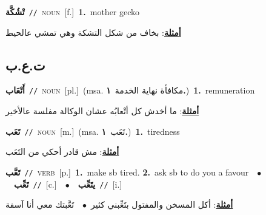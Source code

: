 \documentclass[10pt,a4paper,twoside]{article} %
\begin{document}
\begin{multicols}{2}
{\setlength\topsep{0pt}\textbf{\foreignlanguage{arabic}{تْشُكَّة}}\ {\color{gray}\texttt{//}\color{black}}\ \textsc{noun}\ [f.]\ \textbf{1.}~mother gecko\  \begin{flushright}\color{gray}\foreignlanguage{arabic}{\textbf{\underline{\foreignlanguage{arabic}{أمثلة}}}: بخاف من شكل التشكة وهي تمشي عالحيط}\end{flushright}\color{black}} \vspace{2mm}

\vspace{-3mm}
\subsection*{\color{blue}\foreignlanguage{arabic}{ت.ع.ب}\color{blue}{}} 

{\setlength\topsep{0pt}\textbf{\foreignlanguage{arabic}{أَتْعَاب}}\ {\color{gray}\texttt{//}\color{black}}\ \textsc{noun}\ [pl.]\ \color{gray}(msa. \foreignlanguage{arabic}{مكافأة نهاية الخدمة}~\foreignlanguage{arabic}{\textbf{١.}})\color{black}\ \textbf{1.}~remuneration\  \begin{flushright}\color{gray}\foreignlanguage{arabic}{\textbf{\underline{\foreignlanguage{arabic}{أمثلة}}}: ما أخدش كل أتْعابُه عشان الوكالة مفلسة عالأخير}\end{flushright}\color{black}} \vspace{2mm}

{\setlength\topsep{0pt}\textbf{\foreignlanguage{arabic}{تَعَب}}\ {\color{gray}\texttt{//}\color{black}}\ \textsc{noun}\ [m.]\ \color{gray}(msa. \foreignlanguage{arabic}{تَعَب}~\foreignlanguage{arabic}{\textbf{١.}})\color{black}\ \textbf{1.}~tiredness\  \begin{flushright}\color{gray}\foreignlanguage{arabic}{\textbf{\underline{\foreignlanguage{arabic}{أمثلة}}}: مش قادر أحكي من التَعَب}\end{flushright}\color{black}} \vspace{2mm}

{\setlength\topsep{0pt}\textbf{\foreignlanguage{arabic}{تَعَّب}}\ {\color{gray}\texttt{//}\color{black}}\ \textsc{verb}\ [p.]\ \textbf{1.}~make sb tired.  \textbf{2.}~ask sb to do you a favour\ \ $\bullet$\ \ \setlength\topsep{0pt}\textbf{\foreignlanguage{arabic}{تَعِّب}}\ {\color{gray}\texttt{//}\color{black}}\ [c.]\ \ $\bullet$\ \ \setlength\topsep{0pt}\textbf{\foreignlanguage{arabic}{يتَعِّب}}\ {\color{gray}\texttt{//}\color{black}}\ [i.]\  \begin{flushright}\color{gray}\foreignlanguage{arabic}{\textbf{\underline{\foreignlanguage{arabic}{أمثلة}}}: أكل المسخن والمفتول بتَعِّبني كثير\ $\bullet$\ \  تَعَّبتك معي أنا آسفة}\end{flushright}\color{black}} \vspace{2mm}


\end{multicols}
\end{document}
